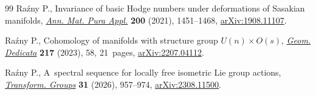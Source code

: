 \documentclass[10pt,a4paper]{amsart}
\numberwithin{equation}{section}
\theoremstyle{definition}
\begin{document}
\begin{thebibliography}{99}
Ra\'zny P., Invariance of basic {H}odge numbers under deformations of
 {S}asakian manifolds,
 \href{https://doi.org/10.1007/s10231-020-01044-8}{\textit{Ann. Mat. Pura
 Appl.}} \textbf{200} (2021), 1451--1468,
 \href{http://arxiv.org/abs/1908.11107}{arXiv:1908.11107}.

Ra\'zny P., Cohomology of manifolds with structure group {$U(n) \times O(s)$},
 \href{https://doi.org/10.1007/s10711-023-00796-w}{\textit{Geom. Dedicata}}
 \textbf{217} (2023), 58, 21~pages,
 \href{http://arxiv.org/abs/2207.04112}{arXiv:2207.04112}.

Ra\'zny P., A~spectral sequence for locally free isometric {L}ie group actions,
 \href{https://doi.org/10.1007/s00031-024-09855-2}{\textit{Transform. Groups}}
 \textbf{31} (2026), 957--974,
 \href{http://arxiv.org/abs/2308.11500}{arXiv:2308.11500}.

\end{thebibliography}
\end{document}
